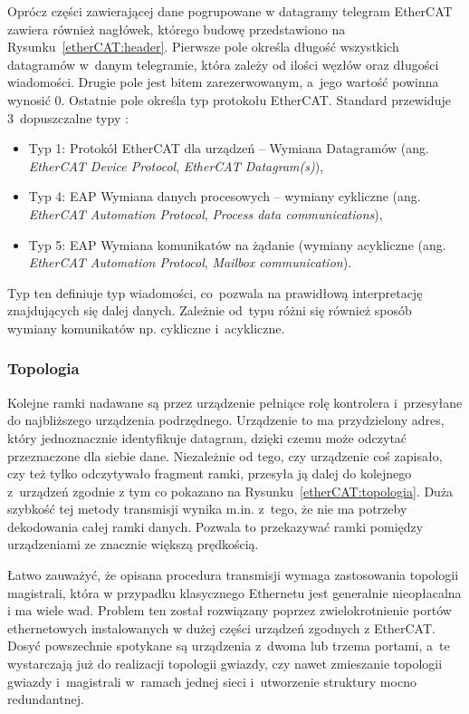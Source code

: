 
Oprócz części zawierającej dane pogrupowane w datagramy telegram EtherCAT zawiera również nagłówek, którego budowę  przedstawiono na Rysunku~\ref{etherCAT:header}. Pierwsze pole określa długość wszystkich datagramów w~danym telegramie, która zależy od ilości węzłów oraz długości wiadomości. Drugie pole jest bitem zarezerwowanym, a~jego wartość powinna wynosić 0. Ostatnie pole określa typ protokołu EtherCAT. 
\clearpage
Standard przewiduje 3~dopuszczalne typy \cite{kurs1}:
\begin{itemize}
\item Typ 1: Protokół EtherCAT dla urządzeń -- Wymiana Datagramów (ang. \textit{EtherCAT Device Protocol}, \textit{EtherCAT Datagram(s)}),
\item Typ 4: EAP Wymiana danych procesowych -- wymiany cykliczne (ang. \textit{EtherCAT Automation Protocol}, \textit{Process data communications}),
\item Typ 5: EAP Wymiana komunikatów na żądanie (wymiany acykliczne (ang. \textit{EtherCAT Automation Protocol}, \textit{Mailbox communication}).
\end{itemize}
Typ ten definiuje typ wiadomości, co~pozwala na prawidłową interpretację znajdujących się dalej danych. Zależnie od~typu różni się również sposób wymiany komunikatów np. cykliczne i~acykliczne.

\subsubsection{Topologia}
Kolejne ramki nadawane są przez urządzenie pełniące rolę kontrolera i~przesyłane do najbliższego urządzenia podrzędnego. Urządzenie to ma przydzielony adres, który jednoznacznie identyfikuje datagram, dzięki czemu może odczytać przeznaczone dla siebie dane. Niezależnie od tego, czy urządzenie coś zapisało, czy też tylko odczytywało fragment ramki, przesyła ją dalej do kolejnego z~urządzeń zgodnie z tym co pokazano na Rysunku~\ref{etherCAT:topologia}. Duża szybkość tej metody transmisji wynika m.in. z~tego, że nie ma potrzeby dekodowania całej ramki danych. Pozwala to przekazywać ramki pomiędzy urządzeniami ze znacznie większą prędkością.


Łatwo zauważyć, że opisana procedura transmisji wymaga zastosowania topologii magistrali, która w przypadku klasycznego Ethernetu jest generalnie nieopłacalna i ma wiele wad. Problem ten został rozwiązany poprzez zwielokrotnienie portów ethernetowych instalowanych w dużej części urządzeń zgodnych z EtherCAT.
Dosyć powszechnie spotykane są urządzenia z~dwoma lub trzema portami, a~te wystarczają już do realizacji topologii gwiazdy, czy nawet zmieszanie topologii gwiazdy i~magistrali w~ramach jednej sieci i~utworzenie struktury mocno redundantnej.

